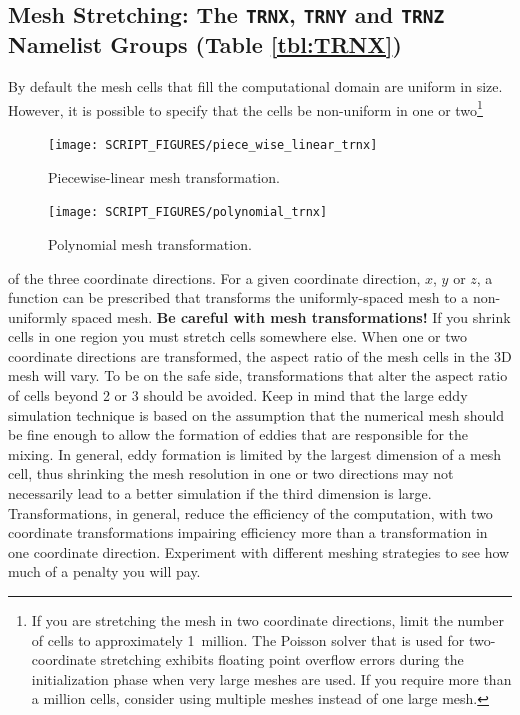 \documentclass[11pt]{book}
\begin{document}
\subsection{Mesh Stretching: The \texorpdfstring{{\tt TRNX}}{TRNX}, \texorpdfstring{{\tt TRNY}}{TRNY} and \texorpdfstring{{\tt TRNZ}}{TRNZ} Namelist Groups (Table \ref{tbl:TRNX})}
\label{info:TRNX}

By default the mesh cells that fill the computational domain are uniform in size. However, it is possible to specify that the cells be non-uniform in one or two\footnote{If you are stretching the mesh in two coordinate directions, limit the number of cells to approximately 1~million. The Poisson solver that is used for two-coordinate stretching exhibits floating point overflow errors during the initialization phase when very large meshes are used. If you require more than a million cells, consider using multiple meshes instead of one large mesh.}
\begin{figure}[ht]
\begin{minipage}[t]{3.1in}
\texttt{[image: SCRIPT\_FIGURES/piece\_wise\_linear\_trnx]}
\vspace{-.2in}
\caption[Piecewise-linear mesh transformation]{Piecewise-linear mesh transformation.}
\label{fig:grid2}
\end{minipage}
\hfill
\begin{minipage}[t]{3.1in}
\texttt{[image: SCRIPT\_FIGURES/polynomial\_trnx]}
\vspace{-.2in}
\caption[Polynomial mesh transformation]{Polynomial mesh transformation.}
\label{fig:grid1}
\end{minipage}
\end{figure}
of the three coordinate directions. For a given coordinate direction, $x$, $y$ or $z$, a function can be prescribed that transforms the uniformly-spaced mesh to a non-uniformly spaced mesh. {\bf Be careful with mesh transformations!}  If you shrink cells in one region you must stretch cells somewhere else. When one or two coordinate directions are transformed, the aspect ratio of the mesh cells in the 3D mesh will vary. To be on the safe side, transformations that alter the aspect ratio of cells beyond 2 or 3 should be avoided. Keep in mind that the large eddy simulation technique is based on the assumption that the numerical mesh should be fine enough to allow the formation of eddies that are responsible for the mixing. In general, eddy formation is limited by the largest dimension of a mesh cell, thus shrinking the mesh resolution in one or two directions may not necessarily lead to a better simulation if the third dimension is large. Transformations, in general, reduce the efficiency of the computation, with two coordinate transformations impairing efficiency more than a transformation in one coordinate direction. Experiment with different meshing strategies to see how much of a penalty you will pay.
\end{document}
